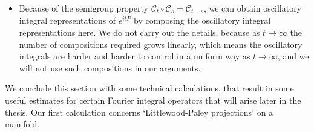 \begin{itemize}
  \item Because of the semigroup property $\mathcal{C}_t \circ \mathcal{C}_s = \mathcal{C}_{t+s}$, we can obtain oscillatory integral representations of $e^{i t P}$ by composing the oscillatory integral representations here. We do not carry out the details, because as $t \to \infty$ the number of compositions required grows linearly, which means the oscillatory integrals are harder and harder to control in a uniform way as $t \to \infty$, and we will not use such compositions in our arguments.
\end{itemize}
%
We conclude this section with some technical calculations, that result in some useful estimates for certain Fourier integral operators that will arise later in the thesis. Our first calculation concerns `Littlewood-Paley projections' on a manifold.

